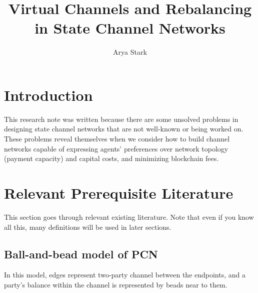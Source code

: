 \documentclass{article}
\author{Arya Stark}
\title{Virtual Channels and Rebalancing in State Channel Networks}
\date{}
\begin{document}
\maketitle

\section*{Introduction}

This research note was written because there are some unsolved problems in designing state channel networks that are not well-known or being worked on. These problems reveal themselves when we consider how to build channel networks capable of expressing agents' preferences over network topology (payment capacity) and capital costs, and minimizing blockchain fees.

\section*{Relevant Prerequisite Literature}

This section goes through relevant existing literature. Note that even if you know all this, many definitions will be used in later sections.

\subsection*{Ball-and-bead model of PCN}

In this model, edges represent two-party channel between the endpoints, and a party's balance within the channel is represented by beads near to them.
\end{document}
